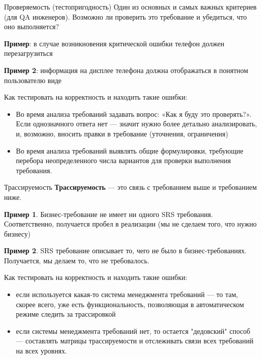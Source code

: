 \documentclass{beamer}
\begin{document}
\begin{frame}[t]{Проверяемость (тестопригодность)}
Один из основных и самых важных критериев (для QA инженеров). Возможно ли проверить это требование и убедиться, что оно выполняется?

\textbf{Пример}: в случае возникновения критической ошибки телефон должен
перезагрузиться

\textbf{Пример 2}: информация на дисплее телефона должна отображаться в понятном
пользователю виде

Как тестировать на корректность и находить такие ошибки:
\begin{itemize}
\item Во время анализа требований задавать вопрос: «Как я буду это проверять?». Если
однозначного ответа нет — значит нужно более детально анализировать, и,
возможно, вносить правки в требование (уточнения, ограничения)
\item Во время анализа требований выявлять общие формулировки, требующие
перебора неопределенного числа вариантов для проверки выполнения
требования.
\end{itemize}
\end{frame}

\begin{frame}[t]{Трассируемость}
\textbf{Трассируемость} — это связь с требованием выше и требованием ниже.

\textbf{Пример 1}. Бизнес-требование не имеет ни одного SRS требования. Соответственно, получается
пробел в реализации (мы не сделаем того, что нужно бизнесу)

\textbf{Пример 2}. SRS требование описывает то, чего не было в бизнес-требованиях. Получается, мы
делаем то, что не требовалось.

Как тестировать на корректность и находить такие ошибки:
\begin{itemize}
\item если используется какая-то система менеджмента требований — то там, скорее
всего, уже есть функциональность, позволяющая в автоматическом режиме
следить за трассировкой
\item если системы менеджмента требований нет, то остается "дедовский" способ —
составлять матрицы трассируемости и отслеживать связи всех
требований на всех уровнях. 
\end{itemize}
\end{frame}
\end{document}
